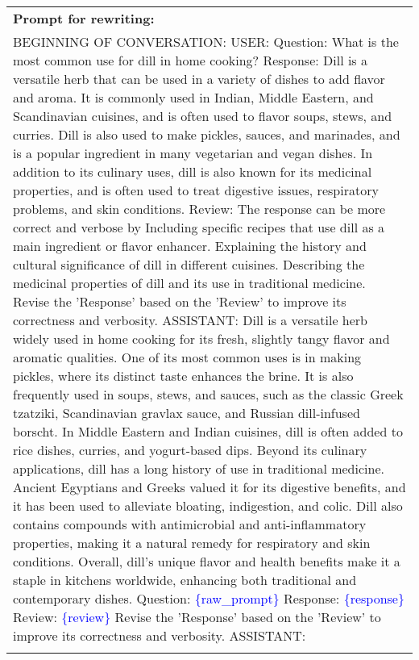 \begin{table*}[t]
{\begin{tabular}{p{}}
\hline
\textbf{Prompt for rewriting:} \\
BEGINNING OF CONVERSATION: USER: Question: What is the most common use for dill in home cooking?\newline
Response: Dill is a versatile herb that can be used in a variety of dishes to add flavor and aroma. It is commonly used in Indian, Middle Eastern, and Scandinavian cuisines, and is often used to flavor soups, stews, and curries. Dill is also used to make pickles, sauces, and marinades, and is a popular ingredient in many vegetarian and vegan dishes. In addition to its culinary uses, dill is also known for its medicinal properties, and is often used to treat digestive issues, respiratory problems, and skin conditions.\newline
Review: The response can be more correct and verbose by\newline
Including specific recipes that use dill as a main ingredient or flavor enhancer.\newline
Explaining the history and cultural significance of dill in different cuisines.\newline
Describing the medicinal properties of dill and its use in traditional medicine.\newline
Revise the 'Response' based on the 'Review' to improve its correctness and verbosity.\newline
ASSISTANT: Dill is a versatile herb widely used in home cooking for its fresh, slightly tangy flavor and aromatic qualities. One of its most common uses is in making pickles, where its distinct taste enhances the brine. It is also frequently used in soups, stews, and sauces, such as the classic Greek tzatziki, Scandinavian gravlax sauce, and Russian dill-infused borscht. In Middle Eastern and Indian cuisines, dill is often added to rice dishes, curries, and yogurt-based dips.\newline
Beyond its culinary applications, dill has a long history of use in traditional medicine. Ancient Egyptians and Greeks valued it for its digestive benefits, and it has been used to alleviate bloating, indigestion, and colic. Dill also contains compounds with antimicrobial and anti-inflammatory properties, making it a natural remedy for respiratory and skin conditions.\newline
Overall, dill's unique flavor and health benefits make it a staple in kitchens worldwide, enhancing both traditional and contemporary dishes.\newline
\newline
Question: \textcolor{blue}{\{raw\_prompt\}} \newline
Response: \textcolor{blue}{\{response\}}\newline
Review: \textcolor{blue}{\{review\}}\newline
Revise the 'Response' based on the 'Review' to improve its correctness and verbosity. \newline
ASSISTANT:\\
\Xhline{1.5pt}
\end{tabular}
}
\caption{Prompts for review generation and rewriting of SIPO on HelpSteer.}
\label{HS review and rewrite}
\end{table*}


